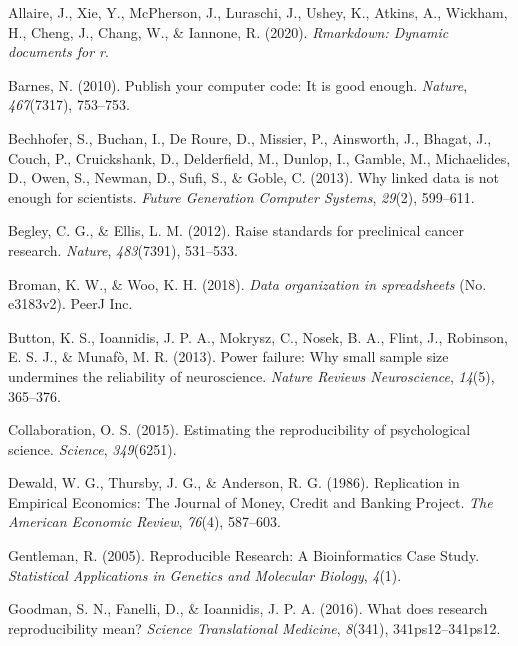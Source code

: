 \documentclass[
  a4paper,
]{article}
\newlength{\cslhangindent}
\newenvironment{CSLReferences}[2] %
 {\begin{list}{}{%
  \setlength{\itemindent}{0pt}
  \setlength{\leftmargin}{0pt}
  \setlength{\parsep}{0pt}
  \ifodd #1
   \setlength{\leftmargin}{\cslhangindent}
   \setlength{\itemindent}{-1\cslhangindent}
  \fi
  \setlength{\itemsep}{#2\baselineskip}}}
 {\end{list}}
\begin{document}
\label{refs}
\begin{CSLReferences}{1}{0}
Allaire, J., Xie, Y., McPherson, J., Luraschi, J., Ushey, K., Atkins,
A., Wickham, H., Cheng, J., Chang, W., \& Iannone, R. (2020).
\emph{Rmarkdown: {Dynamic} documents for r}.

Barnes, N. (2010). Publish your computer code: It is good enough.
\emph{Nature}, \emph{467}(7317), 753--753.

Bechhofer, S., Buchan, I., De Roure, D., Missier, P., Ainsworth, J.,
Bhagat, J., Couch, P., Cruickshank, D., Delderfield, M., Dunlop, I.,
Gamble, M., Michaelides, D., Owen, S., Newman, D., Sufi, S., \& Goble,
C. (2013). Why linked data is not enough for scientists. \emph{Future
Generation Computer Systems}, \emph{29}(2), 599--611.

Begley, C. G., \& Ellis, L. M. (2012). Raise standards for preclinical
cancer research. \emph{Nature}, \emph{483}(7391), 531--533.

Broman, K. W., \& Woo, K. H. (2018). \emph{Data organization in
spreadsheets} (No. e3183v2). PeerJ Inc.

Button, K. S., Ioannidis, J. P. A., Mokrysz, C., Nosek, B. A., Flint,
J., Robinson, E. S. J., \& Munafò, M. R. (2013). Power failure: Why
small sample size undermines the reliability of neuroscience.
\emph{Nature Reviews Neuroscience}, \emph{14}(5), 365--376.

Collaboration, O. S. (2015). Estimating the reproducibility of
psychological science. \emph{Science}, \emph{349}(6251).

Dewald, W. G., Thursby, J. G., \& Anderson, R. G. (1986). Replication in
{Empirical Economics}: {The Journal} of {Money}, {Credit} and {Banking
Project}. \emph{The American Economic Review}, \emph{76}(4), 587--603.

Gentleman, R. (2005). Reproducible {Research}: {A Bioinformatics Case
Study}. \emph{Statistical Applications in Genetics and Molecular
Biology}, \emph{4}(1).

Goodman, S. N., Fanelli, D., \& Ioannidis, J. P. A. (2016). What does
research reproducibility mean? \emph{Science Translational Medicine},
\emph{8}(341), 341ps12--341ps12.


\end{CSLReferences}
\end{document}
